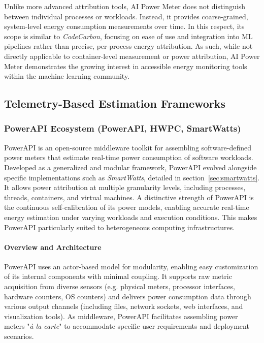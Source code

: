 Unlike more advanced attribution tools, AI Power Meter does not distinguish between individual processes or workloads. Instead, it provides coarse-grained, system-level energy consumption measurements over time. In this respect, its scope is similar to \textit{CodeCarbon}, focusing on ease of use and integration into ML pipelines rather than precise, per-process energy attribution. As such, while not directly applicable to container-level measurement or power attribution, AI Power Meter demonstrates the growing interest in accessible energy monitoring tools within the machine learning community.

\subsection{Telemetry-Based Estimation Frameworks}
\label{sec:telemetry-tools}

\subsubsection{PowerAPI Ecosystem\parencite{powerapi2024github} (PowerAPI, HWPC, SmartWatts)}
\label{sec:powerApiFramework}

PowerAPI\parencite{fieni2024powerapi} is an open-source middleware toolkit for assembling software-defined power meters that estimate real-time power consumption of software workloads. Developed as a generalized and modular framework, PowerAPI evolved alongside specific implementations such as \textit{SmartWatts}, detailed in section~\ref{sec:smartwatts}. It allows power attribution at multiple granularity levels, including processes, threads, containers, and virtual machines. A distinctive strength of PowerAPI is the continuous self-calibration of its power models, enabling accurate real-time energy estimation under varying workloads and execution conditions. This makes PowerAPI particularly suited to heterogeneous computing infrastructures.

\paragraph{Overview and Architecture}

PowerAPI uses an actor-based model for modularity, enabling easy customization of its internal components with minimal coupling. It supports raw metric acquisition from diverse sensors (e.g. physical meters, processor interfaces, hardware counters, OS counters) and delivers power consumption data through various output channels (including files, network sockets, web interfaces, and visualization tools). As middleware, PowerAPI facilitates assembling power meters "\textit{à la carte}" to accommodate specific user requirements and deployment scenarios.

